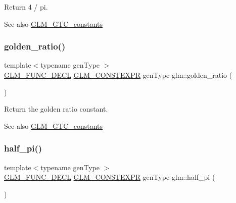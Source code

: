 Return 4 / pi. \begin{DoxySeeAlso}{See also}
\hyperlink{group__gtc__constants}{G\+L\+M\+\_\+\+G\+T\+C\+\_\+constants} 
\end{DoxySeeAlso}
\mbox{\label{group__gtc__constants_ga748cf8642830657c5b7eae04d0a80899}} 
\subsubsection{\texorpdfstring{golden\+\_\+ratio()}{golden\_ratio()}}
{\footnotesize\ttfamily template$<$typename gen\+Type $>$ \\
\hyperlink{setup_8hpp_ab2d052de21a70539923e9bcbf6e83a51}{G\+L\+M\+\_\+\+F\+U\+N\+C\+\_\+\+D\+E\+CL} \hyperlink{setup_8hpp_a08b807947b47031d3a511f03f89645ad}{G\+L\+M\+\_\+\+C\+O\+N\+S\+T\+E\+X\+PR} gen\+Type glm\+::golden\+\_\+ratio (\begin{DoxyParamCaption}{ }\end{DoxyParamCaption})}

Return the golden ratio constant. \begin{DoxySeeAlso}{See also}
\hyperlink{group__gtc__constants}{G\+L\+M\+\_\+\+G\+T\+C\+\_\+constants} 
\end{DoxySeeAlso}
\mbox{\label{group__gtc__constants_ga0c36b41d462e45641faf7d7938948bac}} 
\subsubsection{\texorpdfstring{half\+\_\+pi()}{half\_pi()}}
{\footnotesize\ttfamily template$<$typename gen\+Type $>$ \\
\hyperlink{setup_8hpp_ab2d052de21a70539923e9bcbf6e83a51}{G\+L\+M\+\_\+\+F\+U\+N\+C\+\_\+\+D\+E\+CL} \hyperlink{setup_8hpp_a08b807947b47031d3a511f03f89645ad}{G\+L\+M\+\_\+\+C\+O\+N\+S\+T\+E\+X\+PR} gen\+Type glm\+::half\+\_\+pi (\begin{DoxyParamCaption}{ }\end{DoxyParamCaption})}

